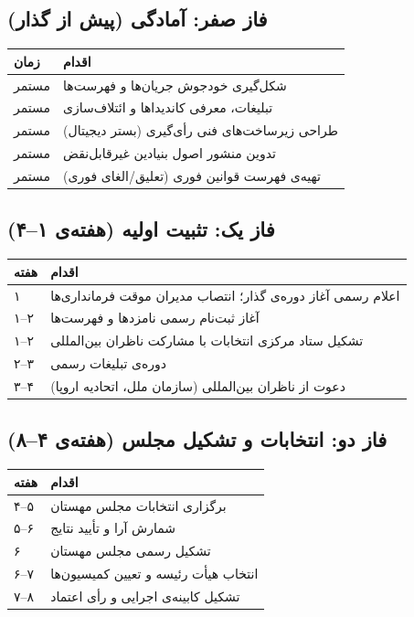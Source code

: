 \subsection*{فاز صفر: آمادگی (پیش از گذار)}
\begin{adjustbox}{max width=\linewidth}
\begin{tabular}{@{}lp{10cm}@{}}
\toprule
\textbf{زمان} & \textbf{اقدام} \\
\midrule
{}
مستمر & شکل‌گیری خودجوش جریان‌ها و فهرست‌ها \\
مستمر & تبلیغات، معرفی کاندیداها و ائتلاف‌سازی \\
مستمر & طراحی زیرساخت‌های فنی رأی‌گیری (بستر دیجیتال) \\
مستمر & تدوین منشور اصول بنیادین غیرقابل‌نقض \\
مستمر & تهیه‌ی فهرست قوانین فوری (تعلیق/الغای فوری) \\
\bottomrule
\end{tabular}
\end{adjustbox}

\subsection*{فاز یک: تثبیت اولیه (هفته‌ی ۱--۴)}
\begin{adjustbox}{max width=\linewidth}
\begin{tabular}{@{}lp{10cm}@{}}
\toprule
\textbf{هفته} & \textbf{اقدام} \\
\midrule
{}
۱ & اعلام رسمی آغاز دوره‌ی گذار؛ انتصاب مدیران موقت فرمانداری‌ها \\
۱--۲ & آغاز ثبت‌نام رسمی نامزدها و فهرست‌ها \\
۱--۲ & تشکیل ستاد مرکزی انتخابات با مشارکت ناظران بین‌المللی \\
۲--۳ & دوره‌ی تبلیغات رسمی \\
۳--۴ & دعوت از ناظران بین‌المللی (سازمان ملل، اتحادیه اروپا) \\
\bottomrule
\end{tabular}
\end{adjustbox}

\subsection*{فاز دو: انتخابات و تشکیل مجلس (هفته‌ی ۴--۸)}
\begin{adjustbox}{max width=\linewidth}
\begin{tabular}{@{}lp{10cm}@{}}
\toprule
\textbf{هفته} & \textbf{اقدام} \\
\midrule
\rowcolor{DangerBg}
۴--۵ & برگزاری انتخابات مجلس مهستان \\
۵--۶ & شمارش آرا و تأیید نتایج \\
\rowcolor{DangerBg}
۶ & تشکیل رسمی مجلس مهستان \\
۶--۷ & انتخاب هیأت رئیسه و تعیین کمیسیون‌ها \\
\rowcolor{DangerBg}
۷--۸ & تشکیل کابینه‌ی اجرایی و رأی اعتماد \\
\bottomrule
\end{tabular}
\end{adjustbox}

